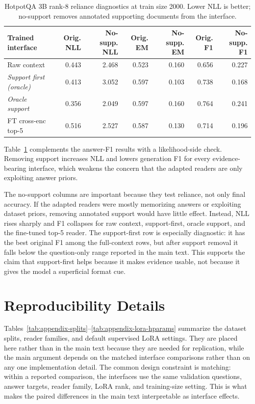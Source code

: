 \documentclass[a4paper,fleqn]{cas-sc}
\begin{document}
\begin{table}[!hbp]
\centering
\caption{HotpotQA 3B rank-8 reliance diagnostics at train size 2000. Lower NLL
is better; no-support removes annotated supporting documents from the interface.}
\label{tab:appendix-reliance-full}
\scriptsize
\setlength{\tabcolsep}{4pt}
\begin{tabular}{lrrrrrr}
\toprule
Trained interface & Orig. NLL & No-supp. NLL & Orig. EM & No-supp. EM & Orig. F1 & No-supp. F1 \\
\midrule
Raw context & 0.443 & 2.468 & 0.523 & 0.160 & 0.656 & 0.227 \\
\emph{Support first (oracle)} & 0.413 & 3.052 & 0.597 & 0.103 & 0.738 & 0.168 \\
\emph{Oracle support} & 0.356 & 2.049 & 0.597 & 0.160 & 0.764 & 0.241 \\
FT cross-enc top-5 & 0.516 & 2.527 & 0.587 & 0.130 & 0.714 & 0.196 \\
\bottomrule
\end{tabular}
\end{table}

Table~\ref{tab:appendix-reliance-full} complements the answer-F1 results with a
likelihood-side check. Removing support increases NLL and lowers generation F1
for every evidence-bearing interface, which weakens the concern that the adapted
readers are only exploiting answer priors.

The no-support columns are important because they test reliance, not only final
accuracy. If the adapted readers were mostly memorizing answers or exploiting
dataset priors, removing annotated support would have little effect. Instead,
NLL rises sharply and F1 collapses for raw context, support-first, oracle
support, and the fine-tuned top-5 reader. The support-first row is especially
diagnostic: it has the best original F1 among the full-context rows, but after
support removal it falls below the question-only range reported in the main
text. This supports the claim that support-first helps because it makes
evidence usable, not because it gives the model a superficial format cue.

\FloatBarrier
\section{Reproducibility Details}
\label{app:reproducibility}

Tables~\ref{tab:appendix-splits}--\ref{tab:appendix-lora-hparams} summarize
the dataset splits, reader families, and default supervised LoRA settings.
They are placed here rather than in the main text because they are needed for
replication, while the main argument depends on the matched interface
comparisons rather than on any one implementation detail.
The common design constraint is matching: within a reported comparison, the
interfaces use the same validation questions, answer targets, reader family,
LoRA rank, and training-size setting. This is what makes the paired differences
in the main text interpretable as interface effects.
\end{document}
